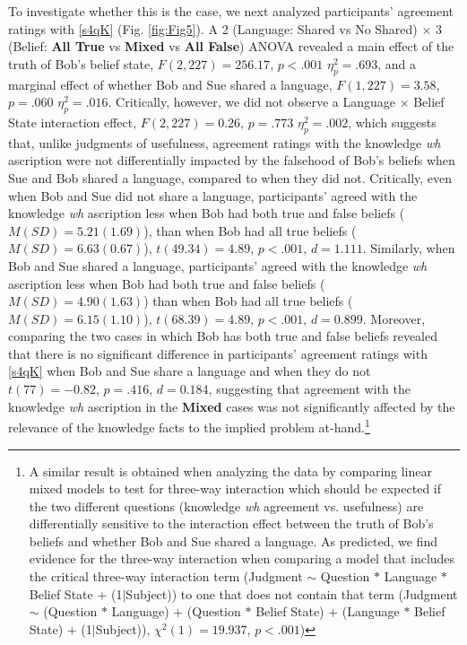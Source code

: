 \documentclass[a4paper]{article}
\begin{document}
To investigate whether this is the case, we next analyzed participants' agreement ratings with \ref{s4qK} (Fig. \ref{fig:Fig5}). A 2 (Language: Shared vs No Shared) $\times$ 3 (Belief: \textbf{All True} vs \textbf{Mixed} vs \textbf{All False}) ANOVA revealed a main effect of the truth of Bob's belief state, $F(2,227) = 256.17$, $p < .001$ $\eta_{p}^{2} = .693$, and a marginal effect of whether Bob and Sue shared a language, $F(1,227) = 3.58$, $p = .060$ $\eta_{p}^{2} = .016$. Critically, however, we did not observe a Language $\times$ Belief State interaction effect, $F(2,227) = 0.26$, $p = .773$ $\eta_{p}^{2} = .002$, which suggests that, unlike judgments of usefulness, agreement ratings with the knowledge \textit{wh} ascription were not differentially impacted by the falsehood of Bob's beliefs when Sue and Bob shared a language, compared to when they did not. Critically, even when Bob and Sue did not share a language, participants' agreed with the knowledge \textit{wh} ascription less when Bob had both true and false beliefs (${M}({SD}) = 5.21(1.69)$), than when Bob had all true beliefs (${M}({SD}) = 6.63(0.67)$), $t(49.34) = 4.89$, $p < .001$, $d = 1.111$. Similarly, when Bob and Sue shared a language, participants' agreed with the knowledge \textit{wh} ascription less when Bob had both true and false beliefs (${M}({SD}) = 4.90(1.63)$) than when Bob had all true beliefs (${M}({SD}) = 6.15(1.10)$), $t(68.39) = 4.89$, $p < .001$, $d = 0.899$. Moreover, comparing the two cases in which Bob has both true and false beliefs revealed that there is no significant difference in participants' agreement ratings with \ref{s4qK} when Bob and Sue share a language and when they do not $t(77) = -0.82$, $p = .416$, $d = 0.184$, suggesting that agreement with the knowledge \textit{wh} ascription in the \textbf{Mixed} cases was not significantly affected by the relevance of the knowledge facts to the implied problem at-hand.\footnote{A similar result is obtained when analyzing the data by comparing linear mixed models to test for three-way interaction which should be expected if the two different questions (knowledge \textit{wh} agreement vs. usefulness) are differentially sensitive to the interaction effect between the truth of Bob's beliefs and whether Bob and Sue shared a language. As predicted, we find evidence for the three-way interaction when comparing a model that includes the critical three-way interaction term (Judgment $\sim$ Question $*$ Language $*$ Belief State $+$ (1$|$Subject)) to one that does not contain that term (Judgment $\sim$ (Question $*$ Language) $+$ (Question $*$ Belief State) $+$ (Language $*$ Belief State) $+$ (1$|$Subject)), $\chi^2(1) = 19.937$, $p < .001$)}
\end{document}
